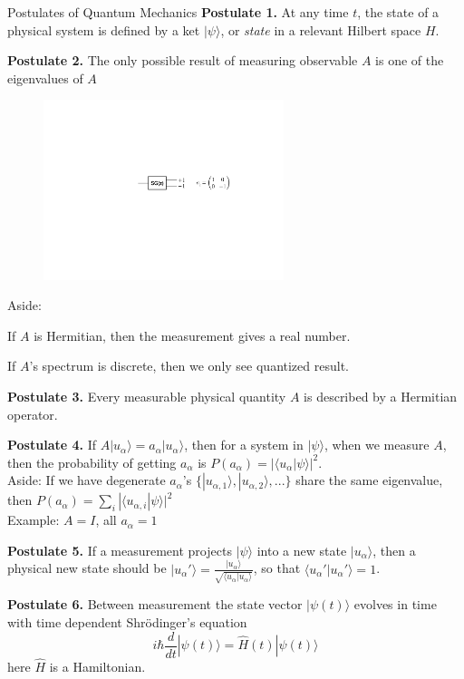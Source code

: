 \documentclass[UTF8,12pt]{article} %
\begin{document}
\begin{myboxes}{Postulates of Quantum Mechanics}{}
\textbf{Postulate 1.} At any time $t$, the state of a physical system is defined by a ket $|\psi\rangle$, or \textit{state} in a relevant Hilbert space $H$.\\\par
\textbf{Postulate 2.} The only possible result of measuring observable $A$ is one of the eigenvalues of $A$
\begin{figure}[H]
\begin{center}
\includegraphics[width=7cm]{post2}
\end{center}
\end{figure}
Aside:
\begin{enumerate*}
\item If $A$ is Hermitian, then the measurement gives a real number.
\item If $A$'s spectrum is discrete, then we only see quantized result.
\end{enumerate*}
\textbf{Postulate 3.} Every measurable physical quantity $A$ is described by a Hermitian operator.\\\par
\textbf{Postulate 4.} If $A|u_{\alpha}\rangle = a_{\alpha}|u_{\alpha}\rangle$, then for a system in $|\psi\rangle$, when we measure $A$, then the probability of getting $a_{\alpha}$ is $P(a_{\alpha}) = |\langle u_{\alpha}|\psi\rangle|^{2}$.\\
Aside: If we have degenerate $a_{\alpha}$'s $\{|u_{\alpha,1}\rangle, |u_{\alpha,2}\rangle, ...\}$ share the same eigenvalue, then $P(a_{\alpha}) = \sum_{i} |\langle u_{\alpha,i}|\psi\rangle|^{2}$\\
Example: $A = I$, all $a_{\alpha} = 1$\\\par
\textbf{Postulate 5.} If a measurement projects $|\psi\rangle$ into a new state $|u_{\alpha}\rangle$, then a physical new state should be $|u_{\alpha}'\rangle = \frac{|u_{\alpha}\rangle}{\sqrt{\langle u_{\alpha}|u_{\alpha}\rangle}}$, so that $\langle u_{\alpha}'|u_{\alpha}'\rangle = 1$.\\\par
\textbf{Postulate 6.} Between measurement the state vector $|\psi(t)\rangle$ evolves in time with time dependent Shr\"{o}dinger's equation $$i\hbar \frac{d}{dt}|\psi(t)\rangle = \hat{H}(t)|\psi(t)\rangle$$ here $\hat{H}$ is a Hamiltonian.
\end{myboxes}
\end{document}
